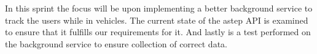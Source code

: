 In this sprint the focus will be upon implementing a better background service to track the users while in vehicles.
The current state of the \gls{astep} API is examined to ensure that it fulfills our requirements for it.
And lastly is a test performed on the background service to ensure collection of correct data.